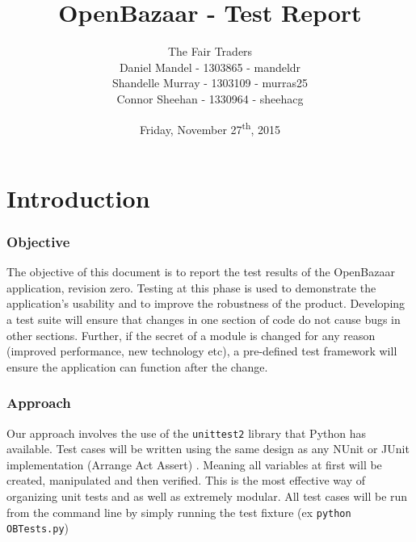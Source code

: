 \documentclass{article}
\begin{document}
\title{OpenBazaar - Test Report}
\author{The Fair Traders\\Daniel Mandel - 1303865 - mandeldr\\Shandelle Murray - 1303109 - murras25\\Connor Sheehan - 1330964 - sheehacg}
\date{Friday, November 27\textsuperscript{th}, 2015}
\maketitle


\newpage
\tableofcontents
\newpage

\part*{Introduction}
\section{Objective}
The objective of this document is to report the test results of the OpenBazaar application, revision zero. Testing at this phase is used to demonstrate the application's usability and to improve the robustness of the product. Developing a test suite will ensure that changes in one section of code do not cause bugs in other sections. Further, if the secret of a module is changed for any reason (improved performance, new technology etc), a pre-defined test framework will ensure the application can function after the change.

\section{Approach}

Our approach involves the use of the \texttt{unittest2} library that Python has available. Test cases will be written using the same design as any NUnit or JUnit implementation (Arrange Act Assert) \cite{aaa}. Meaning all variables at first will be created, manipulated and then verified. This is the most effective way of organizing unit tests and as well as extremely modular. All test cases will be run from the command line by simply running the test fixture (ex \texttt{python OBTests.py})
\end{document}

